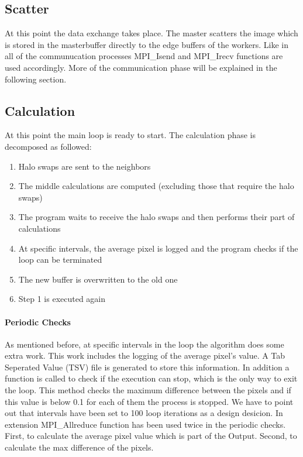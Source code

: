 \documentclass[12pt,a4paper]{article}
\begin{document}
    \subsection{Scatter}
        At this point the data exchange takes place. The master scatters the image which is stored in the masterbuffer directly to the edge buffers of the workers. Like in all of the communucation processes MPI\_Isend and MPI\_Irecv functions are used accordingly. More of the communication phase will be explained in the following section.

    \subsection{Calculation}
        At this point the main loop is ready to start. The calculation phase is decomposed as followed:
        \begin{enumerate}
          \item Halo swaps are sent to the neighbors
          \item The middle calculations are computed (excluding those that require the halo swaps)
          \item The program waits to receive the halo swaps and then performs their part of calculations
          \item At specific intervals, the average pixel is logged and the program checks if the loop can be terminated
          \item The new buffer is overwritten to the old one
          \item Step 1 is executed again
        \end{enumerate}

        \paragraph{Periodic Checks}
        	As mentioned before, at specific intervals in the loop the algorithm does some extra work. This work includes the logging of the average pixel's value. A Tab Seperated Value (TSV) file is generated to store this information. In addition a function is called to check if the execution can stop, which is the only way to exit the loop. This method checks the maximum difference between the pixels and if this value is below 0.1 for each of them the process is stopped. We have to point out that intervals have been set to 100 loop iterations as a design desicion. In extension MPI\_Allreduce function has been used twice in the periodic checks. First, to calculate the average pixel value which is part of the Output. Second, to calculate the max difference of the pixels.
\end{document}
